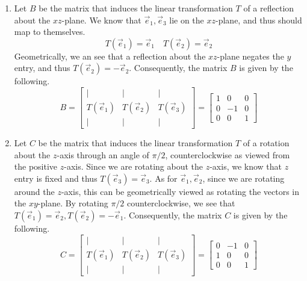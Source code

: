 \begin{SaveQuestion}
\begin{enumerate}
        \item Let $B$ be the matrix that induces the linear transformation $T$ of a reflection about the $xz$-plane. We know that $\vec e_1, \vec e_3$ lie on the $xz$-plane, and thus should map to themselves.
        $$T(\vec e_1) = \vec e_1 \quad T(\vec e_2) = \vec e_2$$
        Geometrically, we an see that a reflection about the $xz$-plane negates the $y$ entry, and thus $T(\vec e_2) = -\vec e_2$.
        Consequently, the matrix $B$ is given by the following. 
        $$B = \begin{bmatrix} \vert & \vert & \vert \\ T(\vec e_1) & T(\vec e_2) & T(\vec e_3) \\ \vert & \vert & \vert \end{bmatrix} = \begin{bmatrix} 1 & 0 & 0 \\ 0 & -1 & 0 \\ 0 & 0 & 1 \end{bmatrix}$$

        \item Let $C$ be the matrix that induces the linear transformation $T$ of a rotation about the $z$-axis through an angle of $\pi / 2$, counterclockwise as viewed from the positive $z$-axis. Since we are rotating about the $z$-axis, we know that $z$ entry is fixed and thus $T(\vec e_3) = \vec e_3$. As for $\vec e_1, \vec e_2$, since we are rotating around the $z$-axis, this can be geometrically viewed as rotating the vectors in the $xy$-plane. By rotating $\pi / 2$ counterclockwise, we see that $T(\vec e_1) = \vec e_2, T(\vec e_2) = -\vec e_1$. 
        Consequently, the matrix $C$ is given by the following.
        $$C = \begin{bmatrix} \vert & \vert & \vert \\ T(\vec e_1) & T(\vec e_2) & T(\vec e_3) \\ \vert & \vert & \vert \end{bmatrix} = \begin{bmatrix} 0 & -1 & 0 \\ 1 & 0 & 0 \\ 0 & 0 & 1 \end{bmatrix}$$
        

\end{enumerate}
\end{SaveQuestion}
